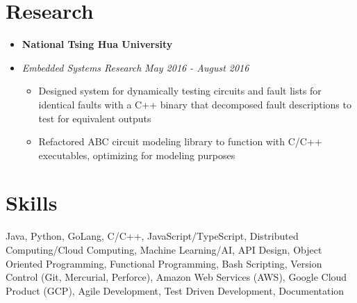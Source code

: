 \documentclass[letterpaper,11pt]{article}
\newcommand{\resumeSubSectionStart}{\begin{itemize}[leftmargin=0.15in, label={}]}
\newcommand{\resumeSubSectionEnd}{\end{itemize}}
\newcommand{\resumeResearchUniversityHeading}[1]{
    \vspace{-2pt}\item
      \textbf{#1}
    \vspace{-7pt}
}
\newcommand{\resumeResearchHeading}[2]{
    \vspace{-4pt}\item
    \textit{#1} \hfill \textit{\small #2}
    \vspace{-11pt}
}
\newcommand{\resumeItemListStart}{\begin{itemize}}
\newcommand{\resumeItemListEnd}{\end{itemize}\vspace{-5pt}}
\newcommand{\resumeItem}[1]{
  \item\small{
    {#1 \vspace{-2pt}}
  }
}
\begin{document}
\section{Research}
\resumeSubSectionStart
\resumeResearchUniversityHeading{National Tsing Hua University}
\resumeResearchHeading{Embedded Systems Research}{May 2016 - August 2016}
\resumeItemListStart
    \resumeItem{Designed system for dynamically testing circuits and fault lists for identical faults with a C++ binary that decomposed fault descriptions to test for equivalent outputs}
    \resumeItem{Refactored ABC circuit modeling library to function with C/C++ executables, optimizing for modeling purposes}
\resumeItemListEnd
\resumeSubSectionEnd


\section{Skills}
\resumeSubSectionStart
    {\footnotesize Java, Python, GoLang, C/C++, JavaScript/TypeScript, Distributed Computing/Cloud Computing, Machine Learning/AI, API Design, Object Oriented Programming, Functional Programming, Bash Scripting, Version Control (Git, Mercurial, Perforce), Amazon Web Services (AWS), Google Cloud Product (GCP), Agile Development, Test Driven Development, Documentation}
\resumeSubSectionEnd
\end{document}
